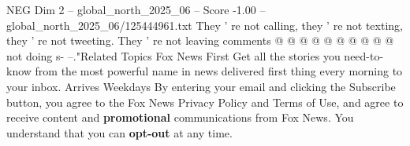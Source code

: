\begin{textsample}{NEG Dim 2 – global\_north\_2025\_06 – Score -1.00 – global\_north\_2025\_06/125444961.txt}
They ' re not calling, they ' re not texting, they ' re not tweeting.
They ' re not leaving comments @ @ @ @ @ @ @ @ @ @ not doing s- --."Related Topics Fox News First Get all the stories you need-to-know from the most powerful name in news delivered first thing every morning to your inbox.
Arrives Weekdays By entering your email and clicking the Subscribe button, you agree to the Fox News Privacy Policy and Terms of Use, and agree to receive content and \textbf{promotional} communications from Fox News.
You understand that you can \textbf{opt-out} at any time.

\end{textsample}
